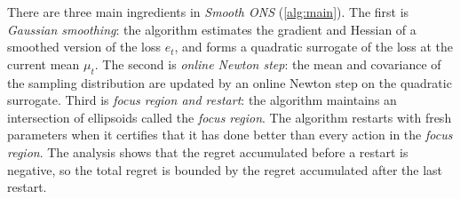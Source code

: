 \documentclass[12pt,cleveref]{jmlr}
\newcommand{\1}{\mathbf 1}
\begin{document}
There are three main ingredients in \textit{Smooth ONS} (\cref{alg:main}).
The first is \textit{Gaussian smoothing}:
the algorithm estimates the gradient and Hessian of a
smoothed version of the loss $e_t$, and forms a
quadratic surrogate of the loss at the current mean $\mu_t$.
The second is \textit{online Newton step}:
the mean and covariance of the sampling distribution are updated
by an online Newton step on the quadratic surrogate.
Third is \textit{focus region and restart}: the algorithm maintains an intersection
of ellipsoids called the \textit{focus region}.
The algorithm restarts with fresh parameters
when it certifies that it has done better than every action in
the \textit{focus region}.
The analysis shows that the regret accumulated before a restart is negative, so
the total regret is bounded by the regret accumulated after the last restart.
\begingroup
{}
\DontPrintSemicolon
\SetAlgoNoLine
\SetAlgoNoEnd
\LinesNumbered
\SetAlFnt{\small}
\newcommand{\algmark}[1]{\tikz[remember picture,overlay]\coordinate (#1);}
\newcommand{\algbrace}[3]{%
    \begin{tikzpicture}[remember picture,overlay]
        \draw[decorate,decoration={brace,amplitude=4pt},black!60]
        ([xshift=-64pt,yshift=7pt]ons-right |- #1) --
        ([xshift=-64pt,yshift=-5pt]ons-right |- #2)
        node[midway,right=7pt,text width=55pt,align=left,
        font=\scriptsize\itshape,text=black!65]{#3};
    \end{tikzpicture}%
}
\end{document}
